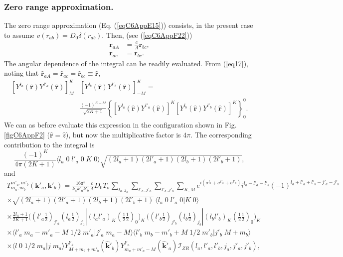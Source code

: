 \subsubsection{Zero range approximation.}
The zero range approximation (Eq. (\ref{eqC6AppE15})) consists, in the present case to assume  $v(r_{ab})=D_0\delta(r_{ab})$. Then, (see (\ref{eqC6AppF22}))
\begin{equation}\label{eqC6AppG52}
\begin{split}
\mathbf{r}_{aA}&=\frac{c}{A}\mathbf{r}_{bc},\\
\mathbf{r}_{ac}&=\mathbf{r}_{bc}.
\end{split} 
\end{equation}
The angular dependence of the integral can be readily evaluated. From (\ref{eq17}), noting that $\hat{\mathbf r}_{aA}=\hat{\mathbf r}_{ac}=\hat{\mathbf r}_{bc}\equiv \hat{\mathbf r}$,
\begin{equation}\label{eqC6AppG53}
\begin{split}
\left[ Y^{l_a} (\hat{\mathbf r}) Y^{l'_a} (\hat{ \mathbf r})\right]^K_M &   \left[ Y^{l_b} (\hat{\mathbf r}) Y^{l'_b} (\hat{\mathbf r})\right]^{K}_{-M}=\\
&\frac{(-1)^{K-M}}{\sqrt{2K+1}}\left\{\left[ Y^{l_a} (\hat{\mathbf r}) Y^{l'_a} (\hat{ \mathbf r})\right]^K\left[ Y^{l_b} (\hat{\mathbf r}) Y^{l'_b} (\hat{\mathbf r})\right]^{K} \right\}^0_0.
\end{split}
\end{equation}
We can as before evaluate this expression in the configuration shown in Fig. \ref{figC6AppF2} ($\hat{\mathbf r}=\hat z$), but now the multiplicative factor is $4\pi$. The corresponding contribution to the integral is
\begin{equation}\label{eqC6AppG54}
\frac{(-1)^K}{4\pi(2K+1)}\langle l_a\;0\;l'_a\;0|K\;0\rangle\sqrt{(2l_a+1)(2l'_a+1)(2l_b+1)(2l'_b+1)},
\end{equation}
and
\begin{multline}\label{eqC6AppG55}
T_{m_a,m_b}^{m'_a,m'_b}(\mathbf{k}'_a,\mathbf{k}'_b)=\frac{16\pi^{2}}{k_ak'_ak'_b}\frac{c}{A}D_0T_\sigma\sum_{l_a,j_a}\sum_{l'_a,j'_a}\sum_{l'_b,j'_b}\sum_{K,M}
 e^{i(\sigma^{l_a}+\sigma^{l'_a}+\sigma^{l'_b})}i^{l_a-l'_a-l'_b}(-1)^{l_a+l'_a+l'_b-j'_a-j'_b}\\
 \times\sqrt{(2l_a+1)(2l'_a+1)(2l_b+1)(2l'_b+1)}\,\langle l_a\;0\;l'_a\;0|K\;0\rangle\\
 \times \frac{2l_a+1}{2K+1}\bigl((l'_a \tfrac{1}{2})_{j'_a}(l_a \tfrac{1}{2})_{j_a}|(l_a l'_a)_K(\tfrac{1}{2} \tfrac{1}{2})_0\bigr)_K\,\bigl((l'_b \tfrac{1}{2})_{j'_b}(l_b \tfrac{1}{2})_{j_b}|(l_b l'_b)_{K}(\tfrac{1}{2} \tfrac{1}{2})_0\bigr)_{K}\\
\times \langle l'_a\;m_a-m'_a-M\;1/2\;m'_a|j'_a\;m_a-M\rangle \langle l'_b\;m_b-m'_b+M\;1/2\;m'_b|j'_b\;M+m_b\rangle\\
\times \langle l\;0\;1/2\;m_a|j\;m_a\rangle Y^{l'_b}_{M+m_b+m'_b} (\hat {\mathbf{k}}'_b)Y^{l'_a}_{m_a+m'_a-M} (\hat {\mathbf{k}}'_a)
\mathcal I_{ZR}(l_a,l'_a,l'_b,j_a,j'_a,j'_b),
\end{multline}
